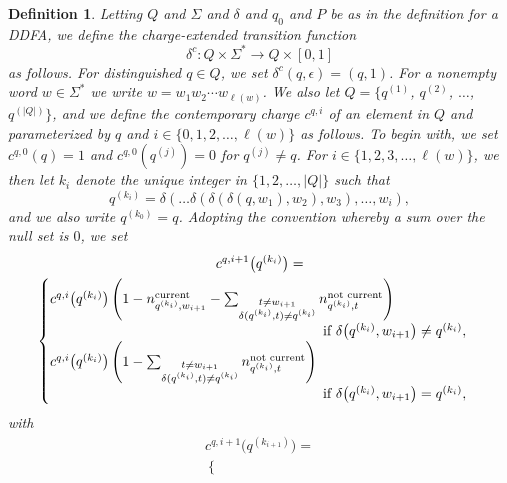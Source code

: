 \documentclass[12pt]{article}
\newtheorem{definition}{Definition}
\begin{document}
\begin{definition}\label{definitionchargeext}
 Letting $Q$ and $\Sigma$ and $\delta$ and $q_0$ and $P$
 be as in the definition for a DDFA, 
 we define the 
 \emph{charge-extended transition function}
 $$ \delta^{c}\colon Q \times \Sigma^{\ast} \to Q \times [0, 1] $$
 as follows. For distinguished $q \in Q$, we set $\delta^{c}(q, \epsilon) = (q, 1)$. 
 For a nonempty word $w \in \Sigma^{\ast}$ we write $w = w_{1} w_{2} \cdots w_{\ell(w)}$. 
 We also let $Q = \{ q^{(1)}$, $ q^{(2)}$, $ \ldots$, $ q^{(|Q|)} \}$, 
 and we define the \emph{contemporary charge} $c^{q, i}$ of an element 
 in $Q$ and parameterized by $q$ 
 and $i \in \{ 0, 1, 2, \ldots, \ell(w) \}$ as follows. 
 To begin with, we set $c^{q, 0}(q) = 1$ 
 and $c^{q, 0}(q^{(j)}) = 0$ for $q^{(j)} \neq q$. 
 For $i \in \{ 1, 2, 3, \ldots, \ell(w) \}$, we then let $k_i$ denote the unique 
 integer in $\{ 1, 2, \ldots, |Q| \}$ such that 
\begin{equation}\label{deltanested}
 q^{(k_i)} = \delta(\ldots \delta(\delta(\delta(q, w_1), w_2), w_3), \ldots, w_{i}), 
\end{equation}
 and we also write $q^{(k_0)} = q$. 
 Adopting the convention whereby a sum over the null set is $0$, we set 
\begin{multline*}
 c^{q, i+1}\big( q^{(k_{i})} \big) = \\
 \begin{cases} 
 c^{q, i}\big( q^{(k_{i})} \big) \left( 1 - n^{\text{current}}_{q^{(k_i)}, w_{i+1}} 
 - \sum_{ \substack{ t \neq w_{i+1} \\ \delta(q^{(k_i)}, t) \neq q^{(k_i)} } } n_{q^{(k_i)}, t}^{\text{not current}} \right) & \null \\ 
 \hspace{2.7in} \text{if $\delta\big( q^{(k_i)}, w_{i+1} \big) \neq q^{(k_i)} $}, & \null \\
 c^{q, i}\big( q^{(k_{i})} \big) \left( 1 
 - \sum_{ \substack{ t \neq w_{i+1} \\ \delta(q^{(k_i)}, t) \neq q^{(k_i)} } } n_{q^{(k_i)}, t}^{\text{not current}} \right) & \null \\ 
 \hspace{2.7in} \text{if $\delta\big( q^{(k_i)}, w_{i+1} \big) = q^{(k_i)} $}, & \null 
 \end{cases}
\end{multline*}
 with 
\begin{multline*}
 c^{q, i+1}\big( q^{(k_{i+1})} \big) = \\
 \begin{cases} 

\end{cases}
\end{multline*}
\end{definition}
\end{document}

